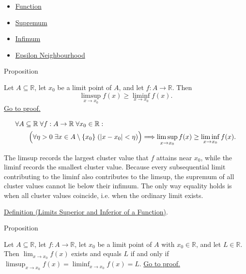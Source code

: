 \begin{dependencies}
\begin{itemize}
  \item \hyperref[def:function]{Function}
  \item \hyperref[def:supremum]{Supremum}
  \item \hyperref[def:infimum]{Infimum}
  \item \hyperref[def:epsilon-neighbourhood]{Epsilon Neighbourhood}
\end{itemize}
\end{dependencies}
\begin{propositionbox}{Proposition}
\begin{proposition}[$\limsup\geq\liminf$]
\label{prop:limsup-geq-liminf-function}
Let $A\subseteq \mathbb{R}$, let $x_0$ be a limit point of $A$, and let $f:A\to\mathbb{R}$. Then
\[
\limsup_{x\to x_0} f(x) \ge \liminf_{x\to x_0} f(x).
\]
\hyperref[prf:limsup-geq-liminf-function]{Go to proof.}
\end{proposition}
\end{propositionbox}

\begin{remark*}
\[
\begin{aligned}
&\forall A\subseteq\mathbb{R}\;\forall f:A\to\mathbb{R}\;\forall x_0\in\mathbb{R}:\\
&\qquad
\Bigl(\forall \eta>0\;\exists x\in A\setminus\{x_0\}\;(|x-x_0|<\eta)\Bigr)
\Longrightarrow
\limsup_{x\to x_0} f(x) \ge \liminf_{x\to x_0} f(x).
\end{aligned}
\]
\end{remark*}

\begin{remark*}[Interpretation]
The limsup records the largest cluster value that $f$ attains near $x_0$, while the liminf records the smallest cluster value. Because every subsequential limit contributing to the liminf also contributes to the limsup, the supremum of all cluster values cannot lie below their infimum. The only way equality holds is when all cluster values coincide, i.e. when the ordinary limit exists.
\end{remark*}

\begin{dependencies}
\hyperref[def:limsup-liminf-function]{Definition (Limits Superior and Inferior of a Function)}.
\end{dependencies}

\begin{propositionbox}{Proposition}
\begin{proposition}[Limit Exists iff $\limsup=\liminf$]
\label{prop:limsup-liminf-limit-criterion}
Let $A \subseteq \mathbb{R}$, let $f \colon A \to \mathbb{R}$, let $x_0$ be a limit point of $A$ with $x_0 \in \mathbb{R}$, and let $L \in \mathbb{R}$. Then $\lim_{x \to x_0} f(x)$ exists and equals $L$ if and only if $\limsup_{x \to x_0} f(x) = \liminf_{x \to x_0} f(x) = L$.
\hyperref[prf:limsup-liminf-limit-criterion]{Go to proof.}
\end{proposition}
\end{propositionbox}

